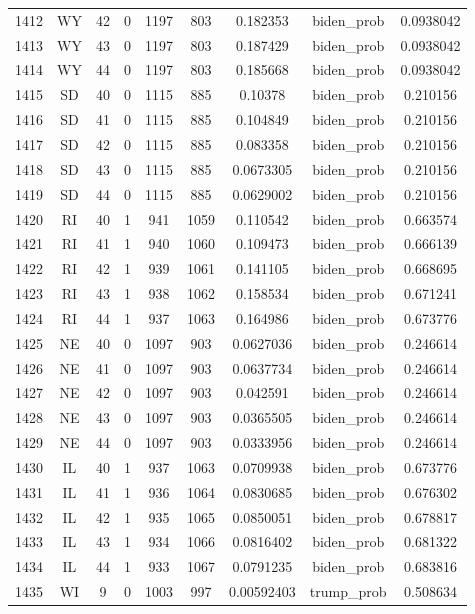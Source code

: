 \documentclass[12pt,a4paper]{article}
\begin{document}
\begin{tabular}{r|cccccccc}
	1412 & WY & 42 & 0 & 1197 & 803 & 0.182353 & biden\_prob & 0.0938042 \\
	1413 & WY & 43 & 0 & 1197 & 803 & 0.187429 & biden\_prob & 0.0938042 \\
	1414 & WY & 44 & 0 & 1197 & 803 & 0.185668 & biden\_prob & 0.0938042 \\
	1415 & SD & 40 & 0 & 1115 & 885 & 0.10378 & biden\_prob & 0.210156 \\
	1416 & SD & 41 & 0 & 1115 & 885 & 0.104849 & biden\_prob & 0.210156 \\
	1417 & SD & 42 & 0 & 1115 & 885 & 0.083358 & biden\_prob & 0.210156 \\
	1418 & SD & 43 & 0 & 1115 & 885 & 0.0673305 & biden\_prob & 0.210156 \\
	1419 & SD & 44 & 0 & 1115 & 885 & 0.0629002 & biden\_prob & 0.210156 \\
	1420 & RI & 40 & 1 & 941 & 1059 & 0.110542 & biden\_prob & 0.663574 \\
	1421 & RI & 41 & 1 & 940 & 1060 & 0.109473 & biden\_prob & 0.666139 \\
	1422 & RI & 42 & 1 & 939 & 1061 & 0.141105 & biden\_prob & 0.668695 \\
	1423 & RI & 43 & 1 & 938 & 1062 & 0.158534 & biden\_prob & 0.671241 \\
	1424 & RI & 44 & 1 & 937 & 1063 & 0.164986 & biden\_prob & 0.673776 \\
	1425 & NE & 40 & 0 & 1097 & 903 & 0.0627036 & biden\_prob & 0.246614 \\
	1426 & NE & 41 & 0 & 1097 & 903 & 0.0637734 & biden\_prob & 0.246614 \\
	1427 & NE & 42 & 0 & 1097 & 903 & 0.042591 & biden\_prob & 0.246614 \\
	1428 & NE & 43 & 0 & 1097 & 903 & 0.0365505 & biden\_prob & 0.246614 \\
	1429 & NE & 44 & 0 & 1097 & 903 & 0.0333956 & biden\_prob & 0.246614 \\
	1430 & IL & 40 & 1 & 937 & 1063 & 0.0709938 & biden\_prob & 0.673776 \\
	1431 & IL & 41 & 1 & 936 & 1064 & 0.0830685 & biden\_prob & 0.676302 \\
	1432 & IL & 42 & 1 & 935 & 1065 & 0.0850051 & biden\_prob & 0.678817 \\
	1433 & IL & 43 & 1 & 934 & 1066 & 0.0816402 & biden\_prob & 0.681322 \\
	1434 & IL & 44 & 1 & 933 & 1067 & 0.0791235 & biden\_prob & 0.683816 \\
	1435 & WI & 9 & 0 & 1003 & 997 & 0.00592403 & trump\_prob & 0.508634 \\

\end{tabular}
\end{document}
